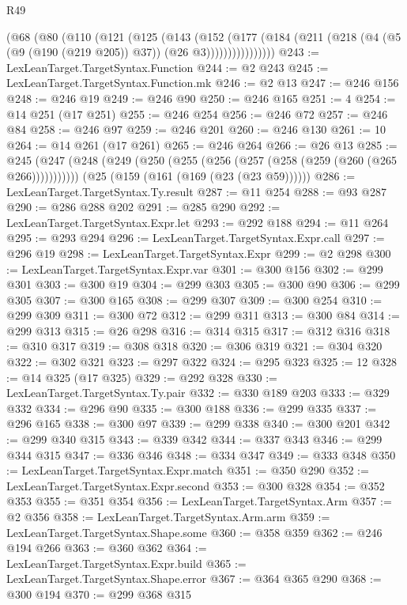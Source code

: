 \begin{lexlean}{R49}
\begin{coremodule}
          (@68
            (@80
              (@110
                (@121
                  (@125
                    (@143
                      (@152
                        (@177
                          (@184
                            (@211 (@218 (@4 (@5 (@9 (@190 (@219 @205)) @37)) (@26 @3))))))))))))))))
@243 := LexLeanTarget.TargetSyntax.Function
@244 := @2 @243
@245 := LexLeanTarget.TargetSyntax.Function.mk
@246 := @2 @13
@247 := @246 @156
@248 := @246 @19
@249 := @246 @90
@250 := @246 @165
@251 := 4
@254 := @14 @251 (@17 @251)
@255 := @246 @254
@256 := @246 @72
@257 := @246 @84
@258 := @246 @97
@259 := @246 @201
@260 := @246 @130
@261 := 10
@264 := @14 @261 (@17 @261)
@265 := @246 @264
@266 := @26 @13
@285 := @245
    (@247 (@248 (@249 (@250 (@255 (@256 (@257 (@258 (@259 (@260 (@265 @266)))))))))))
    (@25 (@159 (@161 (@169 (@23 (@23 @59))))))
@286 := LexLeanTarget.TargetSyntax.Ty.result
@287 := @11 @254
@288 := @93 @287
@290 := @286 @288 @202
@291 := @285 @290
@292 := LexLeanTarget.TargetSyntax.Expr.let
@293 := @292 @188
@294 := @11 @264
@295 := @293 @294
@296 := LexLeanTarget.TargetSyntax.Expr.call
@297 := @296 @19
@298 := LexLeanTarget.TargetSyntax.Expr
@299 := @2 @298
@300 := LexLeanTarget.TargetSyntax.Expr.var
@301 := @300 @156
@302 := @299 @301
@303 := @300 @19
@304 := @299 @303
@305 := @300 @90
@306 := @299 @305
@307 := @300 @165
@308 := @299 @307
@309 := @300 @254
@310 := @299 @309
@311 := @300 @72
@312 := @299 @311
@313 := @300 @84
@314 := @299 @313
@315 := @26 @298
@316 := @314 @315
@317 := @312 @316
@318 := @310 @317
@319 := @308 @318
@320 := @306 @319
@321 := @304 @320
@322 := @302 @321
@323 := @297 @322
@324 := @295 @323
@325 := 12
@328 := @14 @325 (@17 @325)
@329 := @292 @328
@330 := LexLeanTarget.TargetSyntax.Ty.pair
@332 := @330 @189 @203
@333 := @329 @332
@334 := @296 @90
@335 := @300 @188
@336 := @299 @335
@337 := @296 @165
@338 := @300 @97
@339 := @299 @338
@340 := @300 @201
@342 := @299 @340 @315
@343 := @339 @342
@344 := @337 @343
@346 := @299 @344 @315
@347 := @336 @346
@348 := @334 @347
@349 := @333 @348
@350 := LexLeanTarget.TargetSyntax.Expr.match
@351 := @350 @290
@352 := LexLeanTarget.TargetSyntax.Expr.second
@353 := @300 @328
@354 := @352 @353
@355 := @351 @354
@356 := LexLeanTarget.TargetSyntax.Arm
@357 := @2 @356
@358 := LexLeanTarget.TargetSyntax.Arm.arm
@359 := LexLeanTarget.TargetSyntax.Shape.some
@360 := @358 @359
@362 := @246 @194 @266
@363 := @360 @362
@364 := LexLeanTarget.TargetSyntax.Expr.build
@365 := LexLeanTarget.TargetSyntax.Shape.error
@367 := @364 @365 @290
@368 := @300 @194
@370 := @299 @368 @315

\end{coremodule}
\end{lexlean}
